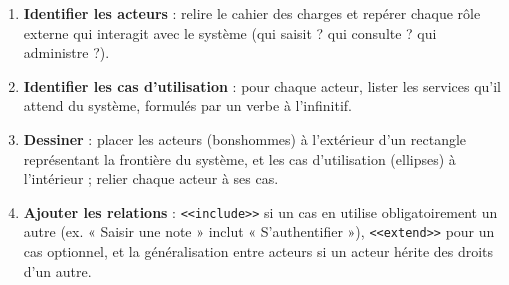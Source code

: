 \documentclass[11pt]{article}
\begin{document}
\begin{methode}
\begin{enumerate}
\item \textbf{Identifier les acteurs} : relire le cahier des charges et repérer chaque rôle externe qui interagit avec le système (qui saisit ? qui consulte ? qui administre ?).
\item \textbf{Identifier les cas d'utilisation} : pour chaque acteur, lister les services qu'il attend du système, formulés par un verbe à l'infinitif.
\item \textbf{Dessiner} : placer les acteurs (bonshommes) à l'extérieur d'un rectangle représentant la frontière du système, et les cas d'utilisation (ellipses) à l'intérieur ; relier chaque acteur à ses cas.
\item \textbf{Ajouter les relations} : \texttt{<<include>>} si un cas en utilise obligatoirement un autre (ex. « Saisir une note » inclut « S'authentifier »), \texttt{<<extend>>} pour un cas optionnel, et la généralisation entre acteurs si un acteur hérite des droits d'un autre.
\end{enumerate}
\end{methode}
\end{document}
